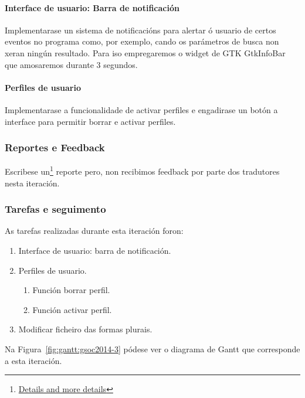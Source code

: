 \paragraph{Interface de usuario: Barra de notificación} Implementarase un sistema de notificacións para alertar ó usuario de certos eventos no programa como, por exemplo, cando os parámetros de busca non xeran ningún resultado. Para iso empregaremos o widget de GTK GtkInfoBar que amosaremos durante 3 segundos.

\paragraph{Perfiles de usuario} Implementarase a funcionalidade de activar perfiles e engadirase un botón a interface para permitir borrar e activar perfiles.

\subsubsection{Reportes e Feedback}

Escribese un\footnote{\href{http://aquelando.info/details-and-more-details/}{Details and more details}} reporte pero, non recibimos feedback por parte dos tradutores nesta iteración.

\subsubsection{Tarefas e seguimento}

As tarefas realizadas durante esta iteración foron:

\begin{enumerate}[label=\bfseries WBS 3.\arabic*]
  \item Interface de usuario: barra de notificación.
  \item Perfiles de usuario.
    \begin{enumerate}[label=\bfseries WBS 3.2\arabic*]
      \item Función borrar perfil.
      \item Función activar perfil.
    \end{enumerate}
  \item Modificar ficheiro das formas plurais.
\end{enumerate}

Na Figura~\ref{fig:gantt:gsoc2014-3} pódese ver o diagrama de Gantt que corresponde a esta iteración.


